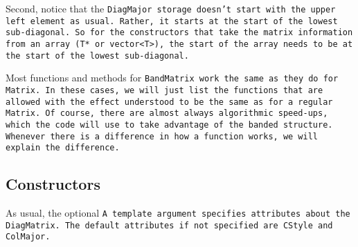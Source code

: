 Second, notice that the \tt{DiagMajor} storage doesn't start with the 
upper left element as usual.
Rather, it starts at the start of the lowest sub-diagonal.  
So for the constructors that 
take the matrix information from an array (\tt{T*} or \tt{vector<T>}), 
the start of the array needs to be at the start of the lowest sub-diagonal.  

Most functions and methods for \tt{BandMatrix} 
work the same as they do for \tt{Matrix}.
In these cases, we will just list the functions that are allowed with the
effect understood to be the same as for a regular \tt{Matrix}.  Of course, there are 
almost always algorithmic speed-ups, which the code will use to take advantage of the 
banded structure.
Whenever there is a difference in how a function works,
we will explain the difference.


\subsection{Constructors}
\label{BandMatrix_Constructors}

As usual, the optional \tt{A} template argument specifies attributes about
the \tt{DiagMatrix}.  The default attributes if not specified are
\tt{CStyle} and \tt{ColMajor}.

